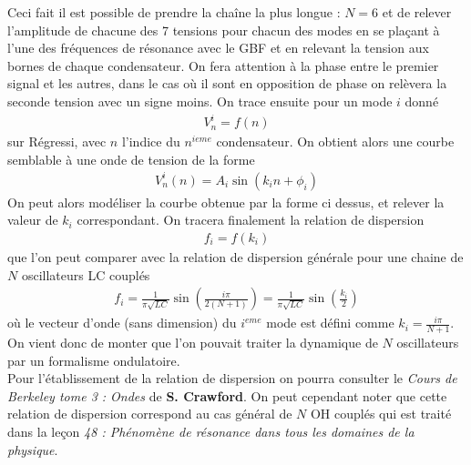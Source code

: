 \documentclass[12pt,prb,aps,epsf]{article}
\begin{document}
Ceci fait il est possible de prendre la chaîne la plus longue : $N=6$ et de relever l'amplitude de chacune des 7 tensions pour chacun des modes en se plaçant à l'une des fréquences de résonance avec le GBF et en relevant la tension aux bornes de chaque condensateur. On fera attention à la phase entre le premier signal et les autres, dans le cas où il sont en opposition de phase on relèvera la seconde tension avec un signe moins. On trace ensuite pour un mode $i$ donné 
\begin{eqnarray}
V_n^i = f(n)
\end{eqnarray}
sur Régressi, avec $n$ l'indice du $n^{ieme}$ condensateur. On obtient alors une courbe semblable à une onde de tension de la forme 
\begin{eqnarray}
V^i_n(n) = A_i\sin(k_in+\phi_i)
\end{eqnarray}
On peut alors modéliser la courbe obtenue par la forme ci dessus, et relever la valeur de $k_i$ correspondant. On tracera finalement la relation de dispersion
\begin{eqnarray}
f_i = f(k_i)
\end{eqnarray}
que l'on peut comparer avec la relation de dispersion générale pour une chaine de $N$ oscillateurs LC couplés 
\begin{eqnarray}
f_i = \frac{1}{\pi\sqrt{LC}}\sin\left(\frac{i\pi}{2(N+1)}\right) = \frac{1}{\pi\sqrt{LC}}\sin\left(\frac{k_i}{2}\right) \label{dispersion}
\end{eqnarray}
où le vecteur d'onde (sans dimension) du $i^{eme}$ mode est défini comme $k_i = \frac{i\pi}{N+1}$. On vient donc de monter que l'on pouvait traiter la dynamique de $N$ oscillateurs par un formalisme ondulatoire.\\

Pour l'établissement de la relation de dispersion on pourra consulter le \textit{Cours de Berkeley tome 3 : Ondes} de \textbf{S. Crawford}. On peut cependant noter que cette relation de dispersion correspond au cas général de $N$ OH couplés qui est traité dans la leçon \textit{48 : Phénomène de résonance dans tous les domaines de la physique}.
\end{document}
